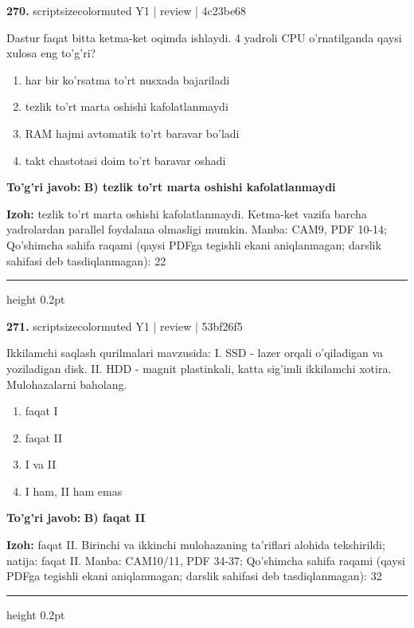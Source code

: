 \documentclass[10pt,a4paper]{article}
\begin{document}
{\bfseries\sffamily\color{ink} 270.} {scriptsizecolor{muted} Y1 | review | 4c23be68}
\par
Dastur faqat bitta ketma-ket oqimda ishlaydi. 4 yadroli CPU o'rnatilganda qaysi xulosa eng to'g'ri?
\begin{enumerate}[label=\Alph*),leftmargin=9mm]
\item har bir ko'rsatma to'rt nusxada bajariladi
\item tezlik to'rt marta oshishi kafolatlanmaydi
\item RAM hajmi avtomatik to'rt baravar bo'ladi
\item takt chastotasi doim to'rt baravar oshadi
\end{enumerate}
\begin{tcolorbox}[enhanced,breakable,colback=teal!4,colframe=teal!60!black,boxrule=0.45pt,arc=1.2mm,left=2.7mm,right=2.7mm,top=1.8mm,bottom=1.8mm,before skip=2mm,after skip=2mm]
{\bfseries\sffamily\color{teal}To'g'ri javob:} \textbf{B) tezlik to'rt marta oshishi kafolatlanmaydi}
\par\smallskip
{\bfseries Izoh:} tezlik to'rt marta oshishi kafolatlanmaydi. Ketma-ket vazifa barcha yadrolardan parallel foydalana olmasligi mumkin. Manba: CAM9, PDF 10-14; Qo'shimcha sahifa raqami (qaysi PDFga tegishli ekani aniqlanmagan; darslik sahifasi deb tasdiqlanmagan): 22
\end{tcolorbox}
\vspace{2mm}\hrule height 0.2pt\vspace{3mm}

{\bfseries\sffamily\color{ink} 271.} {scriptsizecolor{muted} Y1 | review | 53bf26f5}
\par
Ikkilamchi saqlash qurilmalari mavzusida: I. SSD - lazer orqali o'qiladigan va yoziladigan disk. II. HDD - magnit plastinkali, katta sig'imli ikkilamchi xotira. Mulohazalarni baholang.
\begin{enumerate}[label=\Alph*),leftmargin=9mm]
\item faqat I
\item faqat II
\item I va II
\item I ham, II ham emas
\end{enumerate}
\begin{tcolorbox}[enhanced,breakable,colback=teal!4,colframe=teal!60!black,boxrule=0.45pt,arc=1.2mm,left=2.7mm,right=2.7mm,top=1.8mm,bottom=1.8mm,before skip=2mm,after skip=2mm]
{\bfseries\sffamily\color{teal}To'g'ri javob:} \textbf{B) faqat II}
\par\smallskip
{\bfseries Izoh:} faqat II. Birinchi va ikkinchi mulohazaning ta'riflari alohida tekshirildi; natija: faqat II. Manba: CAM10/11, PDF 34-37; Qo'shimcha sahifa raqami (qaysi PDFga tegishli ekani aniqlanmagan; darslik sahifasi deb tasdiqlanmagan): 32
\end{tcolorbox}
\vspace{2mm}\hrule height 0.2pt\vspace{3mm}
\end{document}
